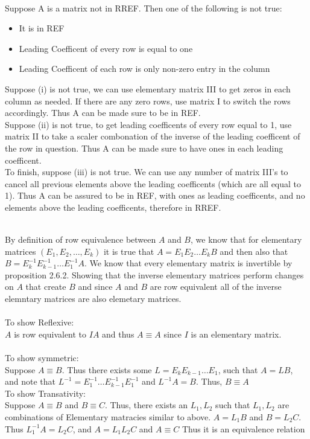 \documentclass[letterpaper,12pt]{article}
\theoremstyle{definition}
\begin{document}
\\
Suppose A is a matrix not in RREF. Then one of the following is not true:\\
\begin{itemize}
    \item It is in REF\\
    \item Leading Coefficent of every row is equal to one
    \item Leading Coefficent of each row is only non-zero entry in the column
\end{itemize}
Suppose (i) is not true, we can use elementary matrix III to get zeros in each column as needed.
If there are any zero rows, use matrix I to switch the rows accordingly. Thus A can be made sure to
be in REF.\\
Suppose (ii) is not true, to get leading coefficents of every row equal to 1, use matrix II
to take a scaler combonation of the inverse of the leading coefficent of the row in question.
Thus A can be made sure to have ones in each leading coefficent.\\
To finish, suppose (iii) is not true. We can use any number of matrix III's to cancel all previous
elements above the leading coefficents (which are all equal to 1). Thus A can be assured to be in REF, with ones
as leading coefficents, and no elements above the leading coefficents, therefore in RREF.

\\

By definition of row equivalence between $A$ and $B$, we know that for elementary matrices
$(E_1,E_2,\dots,E_k)$ it is true that $A  = E_1E_2\dots E_kB$ and then also that 
$B = E_k^{-1}E_{k-1}^{-1}\dots E_1^{-1}A$. We know that every elementary matrix is invertible by 
proposition 2.6.2.  Showing that the inverse elementary matrices perform changes on 
$A$ that create $B$ and since $A$ and $B$ are row equivalent all of the inverse elemntary matrices
are also elemetary matrices. \\
\\
To show Reflexive: \\
$A$ is row equivalent to $IA$ and thus $A \equiv A$ since $I$  is an elementary matrix. \\
\\
To show symmetric:\\
Suppose $A \equiv B$. Thus there exists some $L = E_kE_{k-1}\dots E_1$, such that $A = LB$, and note that
$L^{-1} = E_1^{-1}\dots E_{k-1}^{-1} E_1^{-1}$ and $L^{-1}A = B$. Thus, $B \equiv A$
\\
To show Transativity: \\
Suppose $A \equiv B$ and $B \equiv C$. Thus, there exists an $L_1, L_2$ such that $L_1, L_2$ are combinations of Elementary matracies similar to above.
$A = L_1B$ and $B= L_2C$. Thus $L_1^{-1}A = L_2 C$, and $A = L_1 L_2 C$ and $A \equiv C$
Thus it is an equivalence relation
\end{document}

